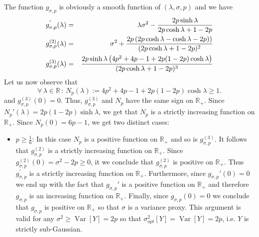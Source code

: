 \documentclass[a4paper, 10pt]{article}
\newcommand{\beq}{\begin{equation}}
\newcommand{\eeq}{\end{equation}}
\newcommand{\bea}{\begin{eqnarray}}
\newcommand{\eea}{\end{eqnarray}}
\theoremstyle{definition}
\begin{document}
The function $g_{\sigma,p}$ is obviously a smooth function of $(\lambda,\sigma,p)$ and we have
\bea g^{'}_{\sigma,p}(\lambda)&=&\lambda \sigma^2 -\frac{2p\sinh \lambda }{2p\cosh \lambda +1-2p}\cr 
g^{(2)}_{\sigma,p}(\lambda)&=&\sigma^2+\frac{2p\left(2p\cosh \lambda -\cosh \lambda -2p)\right)}{(2p\cosh \lambda +1-2p)^2}\cr
g^{(3)}_{\sigma,p}(\lambda)&=&\frac{2p\sinh \lambda\left(4p^2+4p-1+2p(1-2p)\cosh \lambda\right) }{(2p\cosh \lambda +1-2p)^3}
\eea
Let us now observe that 
\beq \forall \, \lambda\in \mathbb{R} \,:\,N_{p}(\lambda):=4p^2+4p-1+2p(1-2p)\cosh \lambda \geq 1.\eeq
and $g^{(3)}_{\sigma,p}(0)=0$. Thus, $g^{(3)}_{\sigma,p}$ and $N_{p}$ have the same sign on $\mathbb{R}_+$. Since $N_{p}'(\lambda)=2p(1-2p)\sinh \lambda$, we get that $N_{p}$ is a strictly increasing function on $\mathbb{R}_+$. Since $N_{p}(0)=6p-1$, we get two distinct cases:
\begin{itemize}
    \item $p\geq \frac{1}{6}$: In this case $N_{p}$ is a positive function on $\mathbb{R}_+$ and so is $g^{(3)}_{\sigma,p}$. It follows that $g_{\sigma,p}^{(2)}$ is a strictly increasing function on $\mathbb{R}_+$. Since $g^{(2)}_{\sigma,p}(0)=\sigma^2-2p\geq0$, it we conclude that $g^{(2)}_{\sigma,p}$ is positive  on $\mathbb{R}_+$. Thus $g^{'}_{\sigma,p}$ is a strictly increasing function on $\mathbb{R}_+$. Furthermore, since $g_{\sigma,p}'(0)=0$ we end up with the fact that $g_{\sigma,p}'$ is a positive function on $\mathbb{R}_+$ and therefore $g_{\sigma,p}$ is an increasing function on $\mathbb{R}_+$. Finally, since $g_{\sigma,p}(0)=0$ we conclude that $g_{\sigma,p}$ is positive on $\mathbb{R}_+$ so that $\sigma$ is a variance proxy. This argument is valid for any $\sigma^2\geq \operatorname{Var}[Y]=2p$ so that $\sigma^2_{opt}[Y]=\operatorname{Var}[Y]=2p$, i.e. {$Y$ is strictly sub-Gaussian}.

\end{itemize}
\end{document}

